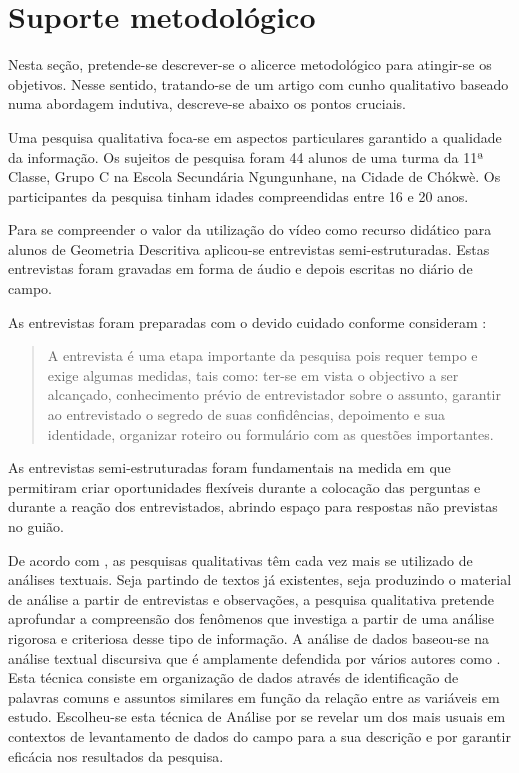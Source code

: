\documentclass[portuguese]{textolivre}
\begin{document}
\section{Suporte metodológico}\label{sec-tres}
Nesta seção, pretende-se descrever-se o alicerce metodológico para atingir-se os objetivos. Nesse sentido, tratando-se de um artigo com cunho qualitativo baseado numa abordagem indutiva, descreve-se abaixo os pontos cruciais.

Uma pesquisa qualitativa foca-se em aspectos particulares garantido a qualidade da informação. Os sujeitos de pesquisa foram 44 alunos de uma turma da 11ª Classe, Grupo C na Escola Secundária Ngungunhane, na Cidade de Chókwè. Os participantes da pesquisa tinham idades compreendidas entre 16 e 20 anos.

Para se compreender o valor da utilização do vídeo como recurso didático para alunos de Geometria Descritiva aplicou-se entrevistas semi-estruturadas. Estas entrevistas foram gravadas em forma de áudio e depois escritas no diário de campo.

As entrevistas foram preparadas com o devido cuidado conforme consideram \textcite[p. 199]{marconi2003}:

\begin{quote}
    A entrevista é uma etapa importante da pesquisa pois requer tempo e exige algumas medidas, tais como: ter-se em vista o objectivo a ser alcançado, conhecimento prévio de entrevistador sobre o assunto, garantir ao entrevistado o segredo de suas confidências, depoimento e sua identidade, organizar roteiro ou formulário com as questões importantes.
\end{quote}

As entrevistas semi-estruturadas foram fundamentais na medida em que permitiram criar oportunidades flexíveis durante a colocação das perguntas e durante a reação dos entrevistados, abrindo espaço para respostas não previstas no guião.

De acordo com \textcite{moraes2003}, as pesquisas qualitativas têm cada vez mais se utilizado de análises textuais. Seja partindo de textos já existentes, seja produzindo o material de análise a partir de entrevistas e observações, a pesquisa qualitativa pretende aprofundar a compreensão dos fenômenos que investiga a partir de uma análise rigorosa e criteriosa desse tipo de informação. A análise de dados baseou-se na análise textual discursiva que é amplamente defendida por vários autores como \textcite{moraes2003}. Esta técnica consiste em organização de dados através de identificação de palavras comuns e assuntos similares em função da relação entre as variáveis em estudo. Escolheu-se esta técnica de Análise por se revelar um dos mais usuais em contextos de levantamento de dados do campo para a sua descrição e por garantir eficácia nos resultados da pesquisa.
\end{document}
